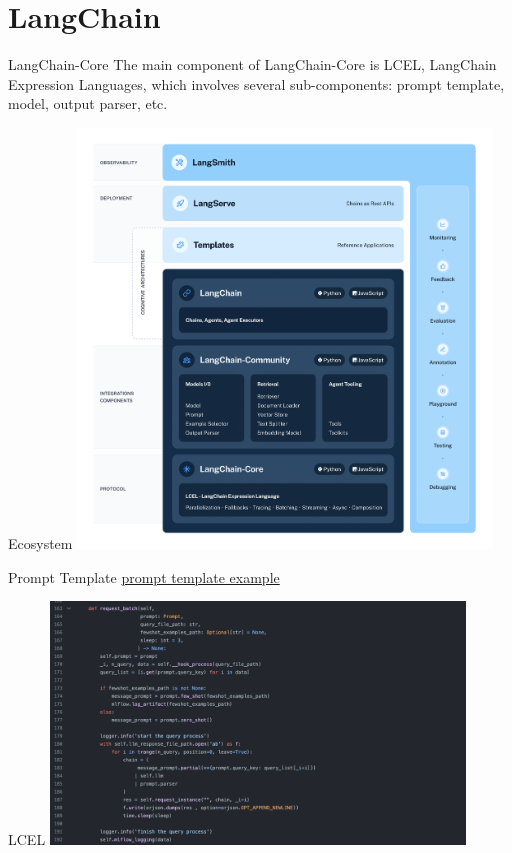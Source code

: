 \documentclass[11.5pt]{beamer}
\begin{document}
\section{LangChain}
\begin{frame}{LangChain-Core}
The main component of LangChain-Core is LCEL, LangChain Expression Languages,
which involves several sub-components: prompt template, model, output parser,
etc.
\end{frame}


\begin{frame}{Ecosystem}
\includegraphics[width=11cm]{Figures/fig6.png}
\end{frame}


\begin{frame}{Prompt Template}
\href{https://github.com/githubjacky/llm-research/blob/main/examples/english_address_to_chinese/main.ipynb}{prompt template example}
\end{frame}


\begin{frame}{LCEL}
\includegraphics[width=11cm]{Figures/fig7.png}
\end{frame}
\end{document}
